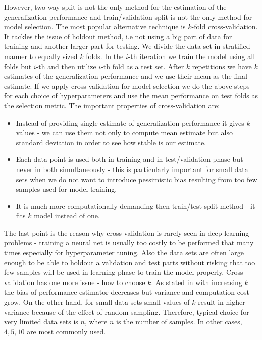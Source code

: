 \documentclass[shortabstract, english, mgr]{iithesis}
\begin{document}
However, two-way split is not the only method for the estimation of the generalization performance and train/validation split is not the only method for model selection. The most popular alternative technique is $k$-fold cross-validation. It tackles the issue of holdout method, i.e not using a big part of data for training and another larger part for testing. We divide the data set in stratified manner to equally sized $k$ folds. In the $i$-th iteration we train the model using all folds but $i$-th and then utilize $i$-th fold as a test set. After $k$ repetitions we have $k$ estimates of the generalization performance and we use their mean as the final estimate. If we apply cross-validation for model selection we do the above steps for each choice of hyperparameters and use the mean performance on test folds as the selection metric. The important properties of cross-validation are:
\begin{itemize}
    \item Instead of providing single estimate of generalization performance it gives $k$ values - we can use them not only to compute mean estimate but also standard deviation in order to see how stable is our estimate.
    \item Each data point is used both in training and in test/validation phase but never in both simultaneously - this is particularly important for small data sets when we do not want to introduce pessimistic bias resulting from too few samples used for model training.
    \item It is much more computationally demanding then train/test split method - it fits $k$ model instead of one.
\end{itemize}
The last point is the reason why cross-validation is rarely seen in deep learning problems - training a neural net is usually too costly to be performed that many times especially for hyperparameter tuning. Also the data sets are often large enough to be able to holdout a validation and test parts without risking that too few samples will be used in learning phase to train the model properly. Cross-validation has one more issue - how to choose $k$. As stated in \cite{ModelSelection} with increasing $k$ the bias of performance estimator decreases but variance and computation cost grow. On the other hand, for small data sets small values of $k$ result in higher variance because of the effect of random sampling. Therefore, typical choice for very limited data sets is $n$, where $n$ is the number of samples. In other cases, $4,5,10$ are most commonly used.  
\end{document}
